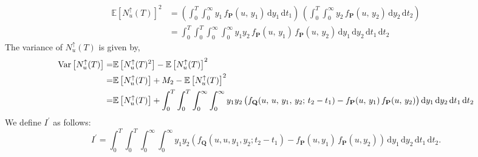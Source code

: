 \documentclass[journal]{IEEEtran}
\theoremstyle{plain}
\theoremstyle{definition}
\theoremstyle{remark}
\newcommand{\E}{\mathbb{E}}
\newcommand{\Nup}{N_u^{\uparrow}(T)}
\newcommand{\dd}{\mathrm{d}}
\newcommand{\Var}{\text{Var}}
\begin{document}
\begin{equation}
\begin{split}
    \E\left[\Nup\right]^2 &= \left(\int_0^T \int_{0}^\infty y_1\, f_{\mathbf{P}}(u,\,y_1) \, \dd y_1 \, \dd t_1\right) \, \left(\int_0^T \int_{0}^\infty y_2\, f_{\mathbf{P}}(u,\,y_2) \, \dd y_2 \, \dd t_2\right) \\
    &= \int_0^T \int_0^T \int_{0}^\infty \int_{0}^\infty y_1 y_2 \, f_{\mathbf{P}}(u,\,y_1) \, f_{\mathbf{P}}(u,\,y_2) \, \dd y_1 \, \dd y_2 \, \dd t_1 \, \dd t_2
\end{split}
\end{equation}
The variance of $\Nup$ is given by,
\begin{equation}
\begin{split}
    \Var\left[\Nup\right] =& \E\left[\Nup^2\right] - \E\left[\Nup\right]^2 \\
    =& \E\left[\Nup\right] + M_2 - \E\left[\Nup\right]^2 \\
    =& \E\left[\Nup\right] + \int_0^T \int_0^T \int_{0}^\infty \int_{0}^\infty y_1 y_2 \,\bigl( f_{\mathbf{Q}}(u, \,u, \,y_1, \,y_2; \, t_2 - t_1) - f_{\mathbf{P}}(u,\,y_1) \, f_{\mathbf{P}}(u,\,y_2)\bigr)\, \dd y_1 \, \dd y_2 \, \dd t_1 \, \dd t_2
\end{split}
\raisetag{45pt}
\end{equation}
We define $I^\prime$ as follows:
\begin{equation}
    I^\prime = \int_0^T \int_0^T \int_{0}^\infty \int_{0}^\infty y_1 y_2 \left( f_{\mathbf{Q}}(u, u, y_1, y_2;  t_2 - t_1) - f_{\mathbf{P}}(u, y_1) \, f_{\mathbf{P}}(u, y_2)\right)\, \dd y_1 \, \dd y_2 \, \dd t_1 \, \dd t_2.
\end{equation}
\end{document}
